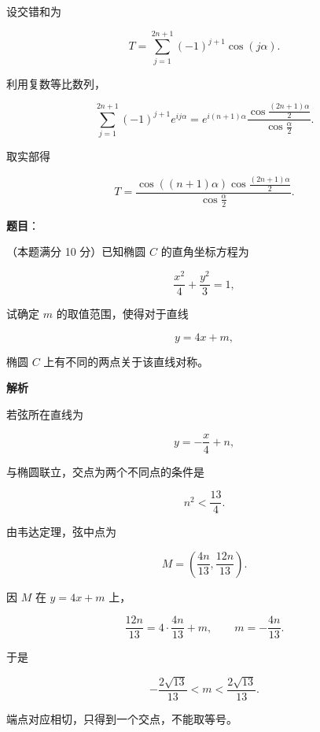 \begin{answer}

设交错和为

\nopagebreak[4]
\[
T=\sum_{j=1}^{2n+1}(-1)^{j+1}\cos(j\alpha).
\]

利用复数等比数列，

\nopagebreak[4]
\[
\sum_{j=1}^{2n+1}(-1)^{j+1}e^{ij\alpha}
=e^{i(n+1)\alpha}
\frac{\cos\frac{(2n+1)\alpha}{2}}
{\cos\frac\alpha2}.
\]

取实部得

\nopagebreak[4]
\[
T=\frac{\cos((n+1)\alpha)
\cos\frac{(2n+1)\alpha}{2}}
{\cos\frac\alpha2}.
\]




\end{answer}
\begin{answer}

\textbf{题目}：

（本题满分 10 分）已知椭圆 $C$ 的直角坐标方程为

\nopagebreak[4]
\[
\frac{x^2}{4}+\frac{y^2}{3}=1,
\]

试确定 $m$ 的取值范围，使得对于直线

\nopagebreak[4]
\[
y=4x+m,
\]

椭圆 $C$ 上有不同的两点关于该直线对称。

\textbf{解析}

若弦所在直线为

\nopagebreak[4]
\[
y=-\frac x4+n,
\]

与椭圆联立，交点为两个不同点的条件是

\nopagebreak[4]
\[
n^2<\frac{13}{4}.
\]

由韦达定理，弦中点为

\nopagebreak[4]
\[
M=\left(\frac{4n}{13},\frac{12n}{13}\right).
\]

因 $M$ 在 $y=4x+m$ 上，

\nopagebreak[4]
\[
\frac{12n}{13}
=4\cdot\frac{4n}{13}+m,
\qquad
m=-\frac{4n}{13}.
\]

于是

\nopagebreak[4]
\[
-\frac{2\sqrt{13}}{13}
<m<
\frac{2\sqrt{13}}{13}.
\]

端点对应相切，只得到一个交点，不能取等号。


\end{answer}